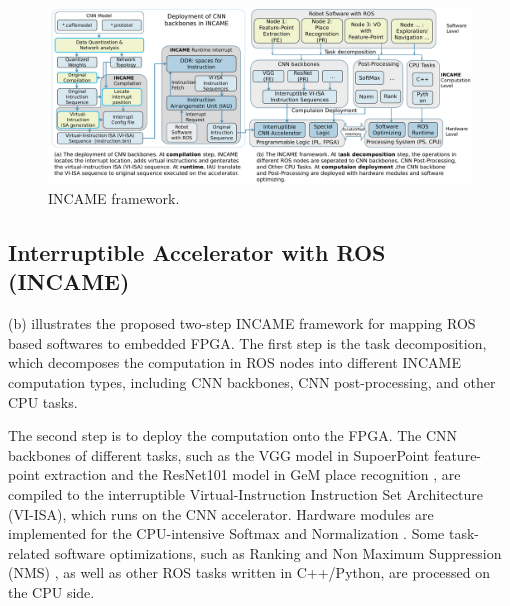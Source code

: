 \begin{figure}[t]
	\centering
    \vspace{-0.1cm} 
    \setlength{\abovecaptionskip}{0cm} 
    \setlength{\belowcaptionskip}{-0.05cm} 
    \includegraphics[width=0.9\linewidth]{fig/incame.pdf}
    \caption{ INCAME framework.}
	\label{fig:incame}
\end{figure}

\subsection{ Interruptible Accelerator with ROS (INCAME) }


(b) illustrates the proposed two-step INCAME framework for mapping ROS based softwares to embedded FPGA.
The first step is the task decomposition, which decomposes the computation in ROS nodes into different INCAME computation types, including CNN backbones, CNN post-processing, and other CPU tasks. 

The second step is to deploy the computation onto the FPGA. 
The CNN backbones of different tasks, such as the VGG model \cite{kim2016accurate} in SupoerPoint feature-point extraction \cite{detone2018superpoint} and the ResNet101 model \cite{he2016deep} in GeM place recognition \cite{radenovic2018fine}, are compiled to the interruptible Virtual-Instruction Instruction Set Architecture (VI-ISA), which runs on the CNN accelerator.
Hardware modules are implemented for the CPU-intensive Softmax \cite{Softmax-wiki} and Normalization \cite{Norm}. Some task-related software optimizations, such as Ranking and Non Maximum Suppression (NMS) \cite{NeubeckGool-NMS}, as well as other ROS tasks written in C++/Python, are processed on the CPU side.

